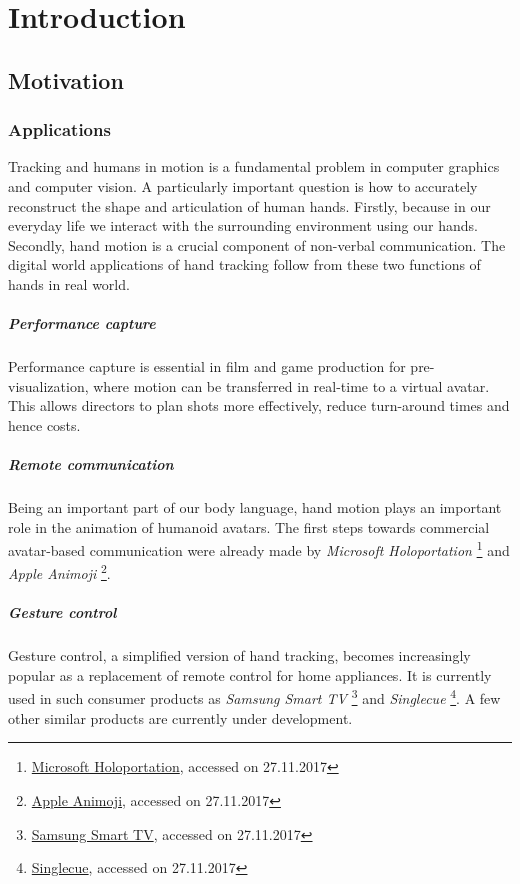 \chapter{Introduction}

\section{Motivation}

\subsection*{Applications}

Tracking and humans in motion is a fundamental problem in computer graphics and computer vision. A particularly important question is how to accurately reconstruct the shape and articulation of human hands. Firstly, because in our everyday life we interact with the surrounding environment using our hands. Secondly, hand motion is a crucial component of non-verbal communication. The digital world applications of hand tracking follow from these two functions of hands in real world.

\paragraph{Performance capture} Performance capture is essential in film and game production for pre-visualization, where motion can be transferred in real-time to a virtual avatar. This allows directors to plan shots more effectively, reduce turn-around times and hence costs. 

\paragraph{Remote communication} Being an important part of our body language, hand motion  plays an important role in the animation of humanoid avatars. The first steps towards commercial avatar-based communication were already made by 
%
\textit{Microsoft Holoportation}
\footnote{\href{https://www.microsoft.com/en-us/research/project/holoportation-3/}{Microsoft Holoportation}, accessed on 27.11.2017}
%
and \textit{Apple Animoji} 
\footnote{\href{https://support.apple.com/en-us/HT208190}{Apple Animoji}, accessed on 27.11.2017}.

\paragraph{Gesture control} Gesture control, a simplified version of hand tracking, becomes increasingly popular as a replacement of remote control for home appliances. It is currently used in such consumer products as 
%
\textit{Samsung Smart TV}
\footnote{\href{http://www.samsung.com/ph/smarttv/motion_control.html}{Samsung Smart TV}, accessed on 27.11.2017}
%
 and \textit{Singlecue}
 \footnote{\href{https://singlecue.com/}{Singlecue}, accessed on 27.11.2017}.
%
 A few other similar products are currently under development.

